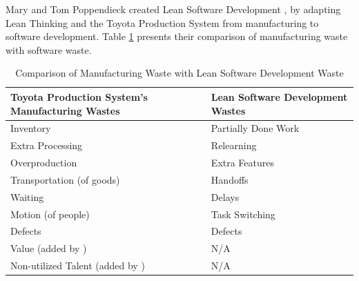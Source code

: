Mary and Tom Poppendieck created Lean Software Development \cite{PoppendieckLeanSoftwareDevelopment}, by adapting Lean Thinking and the Toyota Production System from manufacturing to software development. Table \ref{ManufacturingVersusLeanSoftwareWaste} presents their comparison of manufacturing waste with software waste.

\begin{table}[t]
\renewcommand{\arraystretch}{1.5}
\centering
\caption{Comparison of Manufacturing Waste with Lean Software Development Waste}
\label{ManufacturingVersusLeanSoftwareWaste}
\begin{tabular}{|p{1.55in}|p{1.59in}|}
\hline
Toyota Production System's Manufacturing Wastes & Lean Software Development Wastes \cite{PoppendieckConceptToCash} \\ \hline
Inventory                                       & Partially Done Work                       \\ \hline
Extra Processing                                & Relearning                                \\ \hline
Overproduction                                  & Extra Features                            \\ \hline
Transportation (of goods)                       & Handoffs                                  \\ \hline
Waiting                                         & Delays                                    \\ \hline
Motion (of people)                              & Task Switching                            \\ \hline
Defects                                         & Defects                                   \\ \hline
Value (added by \cite{WomackLeanThinking})                 & N/A                                       \\ \hline
Non-utilized Talent (added by \cite{ LikerToyotaWay})     & N/A                                       \\ \hline
\end{tabular}
\end{table}

